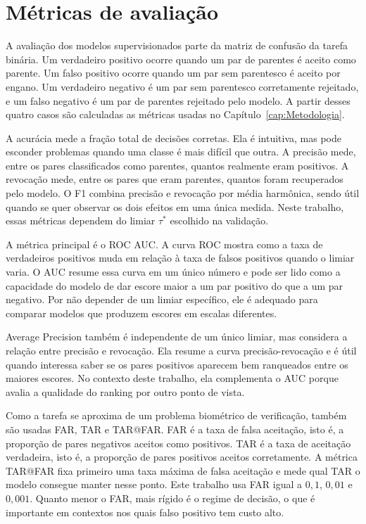 \section{Métricas de avaliação}

A avaliação dos modelos supervisionados parte da matriz de confusão da tarefa binária. Um verdadeiro positivo ocorre quando um par de parentes é aceito como parente. Um falso positivo ocorre quando um par sem parentesco é aceito por engano. Um verdadeiro negativo é um par sem parentesco corretamente rejeitado, e um falso negativo é um par de parentes rejeitado pelo modelo. A partir desses quatro casos são calculadas as métricas usadas no Capítulo~\ref{cap:Metodologia}.

A acurácia mede a fração total de decisões corretas. Ela é intuitiva, mas pode esconder problemas quando uma classe é mais difícil que outra. A precisão mede, entre os pares classificados como parentes, quantos realmente eram positivos. A revocação mede, entre os pares que eram parentes, quantos foram recuperados pelo modelo. O F1 combina precisão e revocação por média harmônica, sendo útil quando se quer observar os dois efeitos em uma única medida. Neste trabalho, essas métricas dependem do limiar $\tau^*$ escolhido na validação.

A métrica principal é o ROC AUC. A curva ROC mostra como a taxa de verdadeiros positivos muda em relação à taxa de falsos positivos quando o limiar varia. O AUC resume essa curva em um único número e pode ser lido como a capacidade do modelo de dar escore maior a um par positivo do que a um par negativo. Por não depender de um limiar específico, ele é adequado para comparar modelos que produzem escores em escalas diferentes.

Average Precision também é independente de um único limiar, mas considera a relação entre precisão e revocação. Ela resume a curva precisão-revocação e é útil quando interessa saber se os pares positivos aparecem bem ranqueados entre os maiores escores. No contexto deste trabalho, ela complementa o AUC porque avalia a qualidade do ranking por outro ponto de vista.

Como a tarefa se aproxima de um problema biométrico de verificação, também são usadas FAR, TAR e TAR@FAR. FAR é a taxa de falsa aceitação, isto é, a proporção de pares negativos aceitos como positivos. TAR é a taxa de aceitação verdadeira, isto é, a proporção de pares positivos aceitos corretamente. A métrica TAR@FAR fixa primeiro uma taxa máxima de falsa aceitação e mede qual TAR o modelo consegue manter nesse ponto. Este trabalho usa FAR igual a $0{,}1$, $0{,}01$ e $0{,}001$. Quanto menor o FAR, mais rígido é o regime de decisão, o que é importante em contextos nos quais falso positivo tem custo alto.


